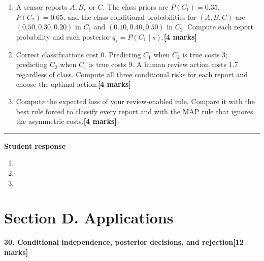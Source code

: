 \documentclass[11pt,a4paper]{article}
\newlength{\BlankAnswerHeight}\setlength{\BlankAnswerHeight}{16mm}
\newcommand{\AnswerBlank}{\leavevmode\par\vspace{\BlankAnswerHeight}}
\begin{document}
\begin{enumerate}[label=(\alph*),leftmargin=8mm,itemsep=3pt]
\item A sensor reports \(A,B,\) or \(C\). The class priors are \(P(C_1)=0.35\), \(P(C_2)=0.65\), and the class-conditional probabilities for \((A,B,C)\) are \((0.50,0.30,0.20)\) in \(C_1\) and \((0.10,0.40,0.50)\) in \(C_2\). Compute each report probability and each posterior \(q_s=P(C_1\mid s)\).\hfill\textbf{[4 marks]}
\item Correct classifications cost 0. Predicting \(C_1\) when \(C_2\) is true costs 3; predicting \(C_2\) when \(C_1\) is true costs 9. A human review action costs 1.7 regardless of class. Compute all three conditional risks for each report and choose the optimal action.\hfill\textbf{[4 marks]}
\item Compute the expected loss of your review-enabled rule. Compare it with the best rule forced to classify every report and with the MAP rule that ignores the asymmetric costs.\hfill\textbf{[4 marks]}
\end{enumerate}\par\medskip\hrule\medskip\textbf{Student response}\par
\begin{enumerate}[label=(\alph*),leftmargin=8mm,itemsep=3pt]
\item
\AnswerBlank
\item
\AnswerBlank
\item
\AnswerBlank
\end{enumerate}
\newpage\section*{Section D. Applications}
\textbf{30. Conditional independence, posterior decisions, and rejection}\hfill\textbf{[12 marks]}\par\medskip
\end{document}
